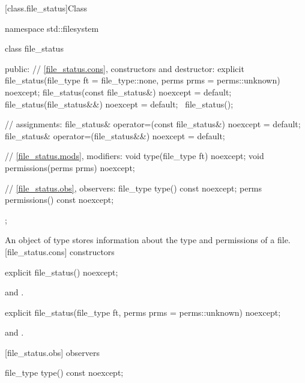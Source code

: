 [class.file_status]{Class }

%
\begin{codeblock}
namespace std::filesystem {
  class file_status {
  public:
    // \ref{file_status.cons}, constructors and destructor:
    explicit file_status(file_type ft = file_type::none,
                         perms prms = perms::unknown) noexcept;
    file_status(const file_status&) noexcept = default;
    file_status(file_status&&) noexcept = default;
   ~file_status();

    // assignments:
    file_status& operator=(const file_status&) noexcept = default;
    file_status& operator=(file_status&&) noexcept = default;

    // \ref{file_status.mods}, modifiers:
    void       type(file_type ft) noexcept;
    void       permissions(perms prms) noexcept;

    // \ref{file_status.obs}, observers:
    file_type  type() const noexcept;
    perms      permissions() const noexcept;
  };
}
\end{codeblock}

\pnum
An object of type  stores information about the type
and permissions of a file.
[file_status.cons]{ constructors}

%
\begin{itemdecl}
explicit file_status() noexcept;
\end{itemdecl}

\begin{itemdescr}
\pnum
\postconditions {} and .
\end{itemdescr}

%
\begin{itemdecl}
explicit file_status(file_type ft, perms prms = perms::unknown) noexcept;
\end{itemdecl}

\begin{itemdescr}
\pnum
\postconditions {} and .
\end{itemdescr}

[file_status.obs]{ observers}

%
\begin{itemdecl}
file_type type() const noexcept;
\end{itemdecl}


